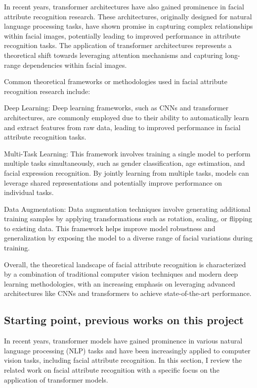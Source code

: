 \documentclass[a4paper,oneside]{article}
\begin{document}
In recent years, transformer architectures have also gained prominence in facial attribute recognition research. These architectures, originally designed for natural language processing tasks, have shown promise in capturing complex relationships within facial images, potentially leading to improved performance in attribute recognition tasks. The application of transformer architectures represents a theoretical shift towards leveraging attention mechanisms and capturing long-range dependencies within facial images.

Common theoretical frameworks or methodologies used in facial attribute recognition research include:

Deep Learning: Deep learning frameworks, such as CNNs and transformer architectures, are commonly employed due to their ability to automatically learn and extract features from raw data, leading to improved performance in facial attribute recognition tasks.

Multi-Task Learning: This framework involves training a single model to perform multiple tasks simultaneously, such as gender classification, age estimation, and facial expression recognition. By jointly learning from multiple tasks, models can leverage shared representations and potentially improve performance on individual tasks.

Data Augmentation: Data augmentation techniques involve generating additional training samples by applying transformations such as rotation, scaling, or flipping to existing data. This framework helps improve model robustness and generalization by exposing the model to a diverse range of facial variations during training.

Overall, the theoretical landscape of facial attribute recognition is characterized by a combination of traditional computer vision techniques and modern deep learning methodologies, with an increasing emphasis on leveraging advanced architectures like CNNs and transformers to achieve state-of-the-art performance.

\subsection{Starting point, previous works on this project}
\label{sec:prev_works}

In recent years, transformer models have gained prominence in various natural language processing (NLP) tasks and have been increasingly applied to computer vision tasks, including facial attribute recognition. In this section, I review the related work on facial attribute recognition with a specific focus on the application of transformer models.
\end{document}
